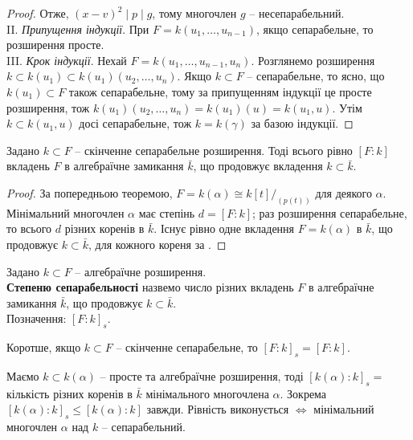 \documentclass{math_library}
\begin{document}
\begin{proof}
Отже, $(x-v)^2 \mid p \mid g$, тому многочлен $g$ -- несепарабельний.
\bigskip \\
II. \textit{Припущення індукції}. При $F = k(u_1,\dots,u_{n-1})$, якщо сепарабельне, то розширення просте.\\
III. \textit{Крок індукції}. Нехай $F = k(u_1,\dots,u_{n-1},u_n)$. Розглянемо розширення $k \subset k(u_1) \subset k(u_1)(u_2,\dots,u_n)$. Якщо $k \subset F$ -- сепарабельне, то ясно, що $k(u_1) \subset F$ також сепарабельне, тому за припущенням індукції це просте розширення, тож $k(u_1)(u_2,\dots,u_n) = k(u_1)(u) = k(u_1,u)$. Утім $k \subset k(u_1,u)$ досі сепарабельне, тож $k = k(\gamma)$ за базою індукції.
\end{proof}

\begin{corollary}
Задано $k \subset F$ -- скінченне сепарабельне розширення. Тоді всього рівно $[F:k]$ вкладень $F$ в алгебраїчне замикання $\bar{k}$, що продовжує вкладення $k \subset \bar{k}$.
\end{corollary}

\begin{proof}
За попередньою теоремою, $F = k(\alpha) \cong k[t]/_{(p(t))}$ для деякого $\alpha$. Мінімальний многочлен $\alpha$ має степінь $d = [F:k]$; раз розширення сепарабельне, то всього $d$ різних коренів в $\bar{k}$. Існує рівно одне вкладення $F = k(\alpha)$ в $\bar{k}$, що продовжує $k \subset \bar{k}$, для кожного кореня за .
\end{proof}

\begin{definition}
Задано $k \subset F$ -- алгебраїчне розширення.\\
\textbf{Степеню сепарабельності} назвемо число різних вкладень $F$ в алгебраїчне замикання $\bar{k}$, що продовжує $k \subset \bar{k}$.\\
Позначення: $[F:k]_s$.
\end{definition}

\begin{remark}
Коротше, якщо $k \subset F$ -- скінченне сепарабельне, то $[F:k]_s = [F:k]$.
\end{remark}

\begin{example}
Маємо $k \subset k(\alpha)$ -- просте та алгебраїчне розширення, тоді $[k(\alpha):k]_s = $ кількість різних коренів в $\bar{k}$ мінімального многочлена $\alpha$. Зокрема $[k(\alpha):k]_s \leq [k(\alpha):k]$ завжди. Рівність виконується $\iff$ мінімальний многочлен $\alpha$ над $k$ -- сепарабельний.
\end{example}
\end{document}
